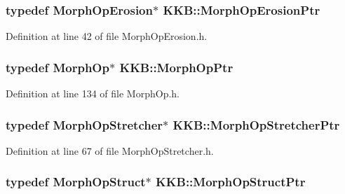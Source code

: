 \subsubsection[{\texorpdfstring{Morph\+Op\+Erosion\+Ptr}{MorphOpErosionPtr}}]{\setlength{\rightskip}{0pt plus 5cm}typedef {\bf Morph\+Op\+Erosion}$\ast$ {\bf K\+K\+B\+::\+Morph\+Op\+Erosion\+Ptr}}\hypertarget{namespace_k_k_b_a429fb7abf87310aa55e71a81453a2e9d}{}\label{namespace_k_k_b_a429fb7abf87310aa55e71a81453a2e9d}


Definition at line 42 of file Morph\+Op\+Erosion.\+h.

\subsubsection[{\texorpdfstring{Morph\+Op\+Ptr}{MorphOpPtr}}]{\setlength{\rightskip}{0pt plus 5cm}typedef {\bf Morph\+Op}$\ast$ {\bf K\+K\+B\+::\+Morph\+Op\+Ptr}}\hypertarget{namespace_k_k_b_a69151b45e9d13bdbf877bbb90894d419}{}\label{namespace_k_k_b_a69151b45e9d13bdbf877bbb90894d419}


Definition at line 134 of file Morph\+Op.\+h.

\subsubsection[{\texorpdfstring{Morph\+Op\+Stretcher\+Ptr}{MorphOpStretcherPtr}}]{\setlength{\rightskip}{0pt plus 5cm}typedef {\bf Morph\+Op\+Stretcher}$\ast$ {\bf K\+K\+B\+::\+Morph\+Op\+Stretcher\+Ptr}}\hypertarget{namespace_k_k_b_af9cdcbd4f5d01cffe65a6f9b9e0ba4c8}{}\label{namespace_k_k_b_af9cdcbd4f5d01cffe65a6f9b9e0ba4c8}


Definition at line 67 of file Morph\+Op\+Stretcher.\+h.

\subsubsection[{\texorpdfstring{Morph\+Op\+Struct\+Ptr}{MorphOpStructPtr}}]{\setlength{\rightskip}{0pt plus 5cm}typedef {\bf Morph\+Op\+Struct}$\ast$ {\bf K\+K\+B\+::\+Morph\+Op\+Struct\+Ptr}}\hypertarget{namespace_k_k_b_a157f40c2d48ae3f1f80b2a2b48a44e51}{}\label{namespace_k_k_b_a157f40c2d48ae3f1f80b2a2b48a44e51}


